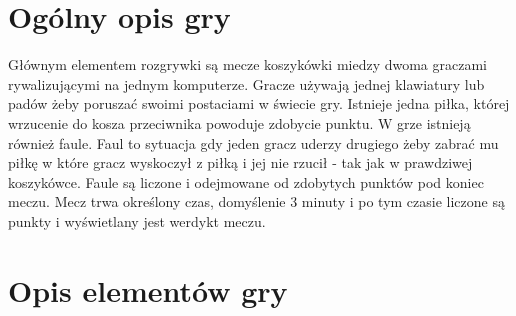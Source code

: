 \documentclass[a4paper,12pt,twoside,openany]{report}
\begin{document}
\section{Ogólny opis gry}
Głównym elementem rozgrywki są mecze koszykówki miedzy dwoma graczami rywalizującymi na jednym komputerze. Gracze używają jednej klawiatury lub padów żeby poruszać swoimi postaciami w świecie gry. Istnieje jedna piłka, której wrzucenie do kosza przeciwnika powoduje zdobycie punktu. W grze istnieją również faule. Faul to sytuacja gdy jeden gracz uderzy drugiego żeby zabrać mu piłkę  w które gracz wyskoczył z piłką i jej nie rzucił - tak jak w prawdziwej koszykówce. Faule są liczone i odejmowane od zdobytych punktów pod koniec meczu. Mecz trwa określony czas, domyślenie 3 minuty i po tym czasie liczone są punkty i wyświetlany jest werdykt meczu.

\section{Opis elementów gry}
\end{document}
